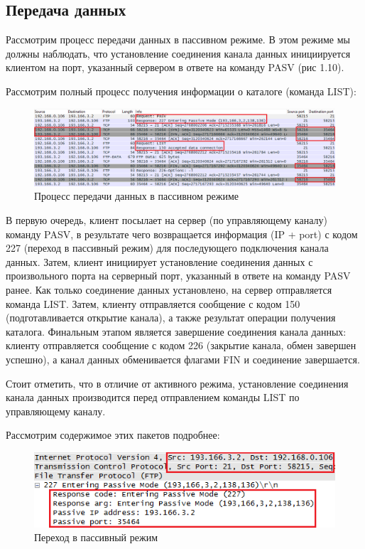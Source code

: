 \documentclass[14pt,a4paper,report]{report}
\begin{document}
\subsection{Передача данных}

Рассмотрим процесс передачи данных в пассивном режиме. В этом режиме мы должны наблюдать, что установление соединения канала данных инициируется клиентом на порт, указанный сервером в ответе на команду PASV (рис 1.10).

Рассмотрим полный процесс получения информации о каталоге (команда LIST):

\begin{figure}[h!]
	\centering
	\includegraphics[scale = 0.60]{images/ftp16.png}
	
	\caption{Процесс передачи данных в пассивном режиме}
	\label{image:21}
\end{figure}

В первую очередь, клиент посылает на сервер (по управляющему каналу) команду PASV, в результате чего возвращается информация (IP + port) с кодом 227 (переход в пассивный режим) для последующего подключения канала данных. Затем, клиент инициирует установление соединения данных с произвольного порта на серверный порт, указанный в ответе на команду PASV ранее. Как только соединение данных установлено, на сервер отправляется команда LIST. Затем, клиенту отправляется сообщение с кодом 150 (подготавливается открытие канала), а также результат операции получения каталога. Финальным этапом является завершение соединения канала данных: клиенту отправляется сообщение с кодом 226 (закрытие канала, обмен завершен успешно), а канал данных обменивается флагами FIN и соединение завершается.

Стоит отметить, что в отличие от активного режима, установление соединения канала данных производится перед отправлением команды LIST по управляющему каналу.

Рассмотрим содержимое этих пакетов подробнее:

\begin{figure}[h!]
	\centering
	\includegraphics[scale = 0.75]{images/ftp17.png}
	
	\caption{Переход в пассивный режим}
	\label{image:22}
\end{figure}
\end{document}
